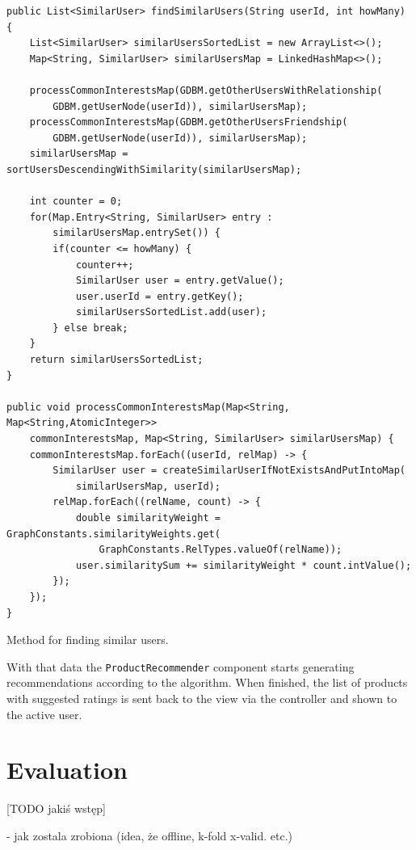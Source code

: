 \documentclass[12pt]{report}
\begin{document}
\begin{listing}[!h]
\begin{verbatim}
public List<SimilarUser> findSimilarUsers(String userId, int howMany) {
    List<SimilarUser> similarUsersSortedList = new ArrayList<>();
    Map<String, SimilarUser> similarUsersMap = LinkedHashMap<>();

    processCommonInterestsMap(GDBM.getOtherUsersWithRelationship(
        GDBM.getUserNode(userId)), similarUsersMap);
    processCommonInterestsMap(GDBM.getOtherUsersFriendship(
        GDBM.getUserNode(userId)), similarUsersMap);
    similarUsersMap = sortUsersDescendingWithSimilarity(similarUsersMap);

    int counter = 0;
    for(Map.Entry<String, SimilarUser> entry : 
        similarUsersMap.entrySet()) {
        if(counter <= howMany) {
            counter++;
            SimilarUser user = entry.getValue();
            user.userId = entry.getKey();
            similarUsersSortedList.add(user);
        } else break;
    }
    return similarUsersSortedList;
}

public void processCommonInterestsMap(Map<String, Map<String,AtomicInteger>>
    commonInterestsMap, Map<String, SimilarUser> similarUsersMap) {
    commonInterestsMap.forEach((userId, relMap) -> {
        SimilarUser user = createSimilarUserIfNotExistsAndPutIntoMap(
            similarUsersMap, userId);
        relMap.forEach((relName, count) -> {
            double similarityWeight = GraphConstants.similarityWeights.get(
                GraphConstants.RelTypes.valueOf(relName));
            user.similaritySum += similarityWeight * count.intValue();
        });
    });
}
\end{verbatim}
\caption{Method for finding similar users.}
\label{listing.find_similar_users}
\end{listing}

With that data the \texttt{ProductRecommender} component starts generating recommendations according to the algorithm. When finished, the list of products with suggested ratings is sent back to the view via the controller and shown to the active user.

%


\chapter{Evaluation}

[TODO jakiś wstęp]

- jak zostala zrobiona (idea, że offline, k-fold x-valid. etc.)
\end{document}
